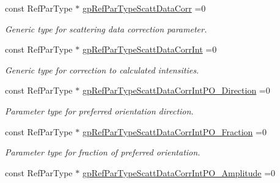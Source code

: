 \begin{DoxyCompactItemize}
\mbox{\label{namespace_obj_cryst_a80b2ef9ba9a58d7f6f4676a1cdd070e6}} 
const Ref\+Par\+Type $\ast$ \mbox{\hyperlink{namespace_obj_cryst_a80b2ef9ba9a58d7f6f4676a1cdd070e6}{gp\+Ref\+Par\+Type\+Scatt\+Data\+Corr}} =0
\begin{DoxyCompactList}\small\item\em Generic type for scattering data correction parameter. \end{DoxyCompactList}\item 
\mbox{\label{namespace_obj_cryst_a98812bde00d1af4b82df095694c7e296}} 
const Ref\+Par\+Type $\ast$ \mbox{\hyperlink{namespace_obj_cryst_a98812bde00d1af4b82df095694c7e296}{gp\+Ref\+Par\+Type\+Scatt\+Data\+Corr\+Int}} =0
\begin{DoxyCompactList}\small\item\em Generic type for correction to calculated intensities. \end{DoxyCompactList}\item 
\mbox{\label{namespace_obj_cryst_a0869b4543466898f1ba7733d96fc4976}} 
const Ref\+Par\+Type $\ast$ \mbox{\hyperlink{namespace_obj_cryst_a0869b4543466898f1ba7733d96fc4976}{gp\+Ref\+Par\+Type\+Scatt\+Data\+Corr\+Int\+P\+O\+\_\+\+Direction}} =0
\begin{DoxyCompactList}\small\item\em Parameter type for preferred orientation direction. \end{DoxyCompactList}\item 
\mbox{\label{namespace_obj_cryst_a7026eaa00cb7ec452f6d90b679fbf911}} 
const Ref\+Par\+Type $\ast$ \mbox{\hyperlink{namespace_obj_cryst_a7026eaa00cb7ec452f6d90b679fbf911}{gp\+Ref\+Par\+Type\+Scatt\+Data\+Corr\+Int\+P\+O\+\_\+\+Fraction}} =0
\begin{DoxyCompactList}\small\item\em Parameter type for fraction of preferred orientation. \end{DoxyCompactList}\item 
\mbox{\label{namespace_obj_cryst_a972649a6759befb4278e80eeef6a49e6}} 
const Ref\+Par\+Type $\ast$ \mbox{\hyperlink{namespace_obj_cryst_a972649a6759befb4278e80eeef6a49e6}{gp\+Ref\+Par\+Type\+Scatt\+Data\+Corr\+Int\+P\+O\+\_\+\+Amplitude}} =0

\end{DoxyCompactItemize}

